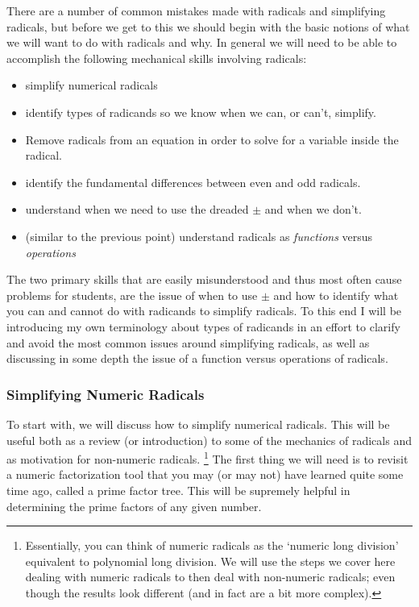     There are a number of common mistakes made with radicals and simplifying radicals, but before we get to this we should begin with the basic notions of what we will want to do with radicals and why. In general we will need to be able to accomplish the following mechanical skills involving radicals:
    \begin{itemize}
    \item simplify numerical radicals
    \item identify types of radicands so we know when we can, or can't, simplify.
    \item Remove radicals from an equation in order to solve for a variable inside the radical.
    \item identify the fundamental differences between even and odd radicals.
    \item understand when we need to use the dreaded $\pm$ and when we don't.
    \item (similar to the previous point) understand radicals as \textit{functions} versus \textit{operations}
    \end{itemize}

    The two primary skills that are easily misunderstood and thus most often cause problems for students, are the issue of when to use $\pm$ and how to identify what you can and cannot do with radicands to simplify radicals. To this end I will be introducing my own terminology about types of radicands in an effort to clarify and avoid the most common issues around simplifying radicals, as well as discussing in some depth the issue of a function versus operations of radicals.

    \subsubsection{Simplifying Numeric Radicals}
        To start with, we will discuss how to simplify numerical radicals. This will be useful both as a review (or introduction) to some of the mechanics of radicals and as motivation for non-numeric radicals.%
        \footnote{Essentially, you can think of numeric radicals as the `numeric long division' equivalent to polynomial long division. We will use the steps we cover here dealing with numeric radicals to then deal with non-numeric radicals; even though the results look different (and in fact are a bit more complex).}
        The first thing we will need is to revisit a numeric factorization tool that you may (or may not) have learned quite some time ago, called a prime factor tree. This will be supremely helpful in determining the prime factors of any given number.

